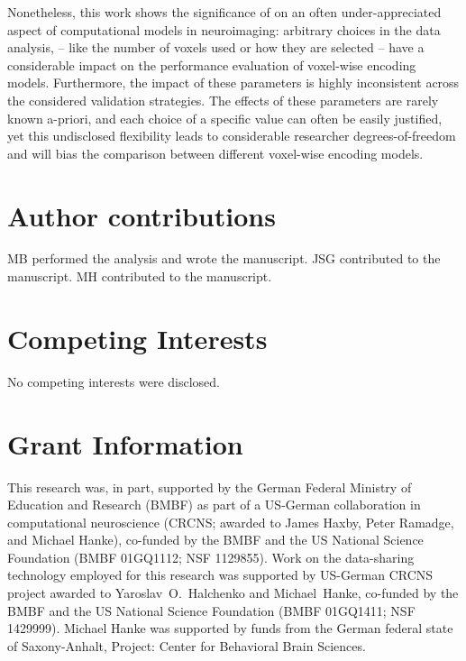 Nonetheless, this work shows the significance of on an often under-appreciated aspect of
computational models in neuroimaging: arbitrary choices in the data analysis,
-- like the number of voxels used or how they are selected --
have a considerable impact on the performance evaluation of
voxel-wise encoding models. Furthermore, the impact of these parameters is
highly inconsistent across the considered validation strategies.
The effects of these parameters are rarely known a-priori, and each choice of a specific value can often
be easily justified, yet this undisclosed flexibility leads to considerable researcher degrees-of-freedom
\citep{SNS11,hong2019false} and will bias the comparison between different
voxel-wise encoding models.

\section*{Author contributions}

MB performed the analysis and wrote the manuscript.
JSG contributed to the manuscript.
MH contributed to the manuscript.

\section*{Competing Interests}

No competing interests were disclosed.

\section*{Grant Information}

This research was, in part, supported by the German Federal Ministry of
Education and Research (BMBF) as part of a US-German collaboration in
computational neuroscience (CRCNS; awarded to James Haxby, Peter Ramadge, and
Michael Hanke), co-funded by the BMBF and the US National Science Foundation
(BMBF 01GQ1112; NSF 1129855).  Work on the data-sharing technology employed for
this research was supported by US-German CRCNS project awarded to
Yaroslav~O.~Halchenko and Michael~Hanke, co-funded by the BMBF and the US
National Science Foundation (BMBF 01GQ1411; NSF 1429999).  Michael Hanke was
supported by funds from the German federal state of Saxony-Anhalt, Project:
Center for Behavioral Brain Sciences.


